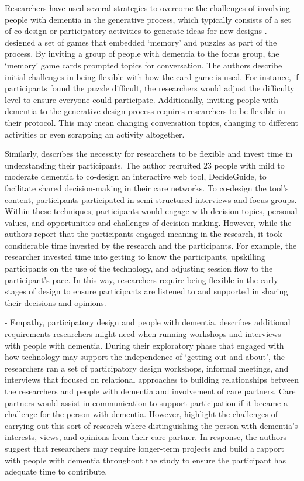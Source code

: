 Researchers have used several strategies to overcome the challenges of involving people with dementia in the generative process, which typically consists of a set of co-design or participatory activities to generate ideas for new designs \citep{suijkerbuijk_active_2019}. \cite{mayer2013lessons} designed a set of games that embedded `memory' and puzzles as part of the process. By inviting a group of people with dementia to the focus group, the `memory' game cards prompted topics for conversation. The authors describe initial challenges in being flexible with how the card game is used. For instance, if participants found the puzzle difficult, the researchers would adjust the difficulty level to ensure everyone could participate. Additionally, inviting people with dementia to the generative design process requires researchers to be flexible in their protocol. This may mean changing conversation topics, changing to different activities or even scrapping an activity altogether.

Similarly, \cite{span2015interactive} describes the necessity for researchers to be flexible and invest time in understanding their participants. The author recruited 23 people with mild to moderate dementia to co-design an interactive web tool, DecideGuide, to facilitate shared decision-making in their care networks. To co-design the tool's content, participants participated in semi-structured interviews and focus groups. Within these techniques, participants would engage with decision topics, personal values, and opportunities and challenges of decision-making. However, while the authors report that the participants engaged meaning in the research, it took considerable time invested by the research and the participants. For example, the researcher invested time into getting to know the participants, upskilling participants on the use of the technology, and adjusting session flow to the participant's pace. In this way, researchers require being flexible in the early stages of design to ensure participants are listened to and supported in sharing their decisions and opinions.

\cite{lindsay_empathy_2012} - Empathy, participatory design and people with dementia, describes additional requirements researchers might need when running workshops and interviews with people with dementia. During their exploratory phase that engaged with how technology may support the independence of `getting out and about', the researchers ran a set of participatory design workshops, informal meetings, and interviews that focused on relational approaches to building relationships between the researchers and people with dementia and involvement of care partners. Care partners would assist in communication to support participation if it became a challenge for the person with dementia. However, \cite{lindsay_empathy_2012} highlight the challenges of carrying out this sort of research where distinguishing the person with dementia's interests, views, and opinions from their care partner. In response, the authors suggest that researchers may require longer-term projects and build a rapport with people with dementia throughout the study to ensure the participant has adequate time to contribute.

